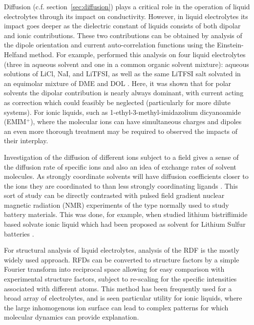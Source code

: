 \documentclass[../main.tex]{subfiles}
\begin{document}
Diffusion (c.f. section~\ref{sec:diffusion}) plays a critical role in the operation of liquid electrolytes through its impact on conductivity. However, in liquid electrolytes its impact goes deeper as the dielectric constant of liquids consists of both dipolar and ionic contributions. These two contributions can be obtained by analysis of the dipole orientation and current auto-correlation functions using the Einstein-Helfand method. For example, \citeauthor{coles_correlation_2020} performed this analysis on four liquid electrolytes (three in aqueous solvent and one in a common organic solvent mixture): aqueous solutions of LiCl, NaI, and LiTFSI, as well as the same LiTFSI salt solvated in an equimolar mixture of DME and DOL \cite{coles_correlation_2020}. Here, it was shown that for polar solvents the dipolar contribution is nearly always dominant, with current acting as correction which could feasibly be neglected (particularly for more dilute systems). For ionic liquids, such as 1-ethyl-3-methyl-imidazolium dicyanoamide (EMIM$^+$), where the molecular ions can have simultaneous charges and dipoles an even more thorough treatment may be required to observed the impacts of their interplay\cite{schroder_dielectric_2009}.

Investigation of the diffusion of different ions subject to a field gives a sense of the diffusion rate of specific ions and also an idea of exchange rates of solvent molecules. As strongly coordinate solvents will have diffusion coefficients closer to the ions they are coordinated to than less strongly coordinating ligands \cite{shimizu_structural_2015, lesch_influence_2015, borodin_litfsi_2006,borodin_li_2006,borodin_li_2007}. This sort of study can be directly contrasted with pulsed field gradient nuclear magnetic radiation (NMR) experiments of the type normally used to study battery materials. This was done, for example, when \citeauthor{shimizu_structural_2015} studied lithium bistriflimide based solvate ionic liquid which had been proposed as solvent for Lithium Sulfur batteries \cite{shimizu_structural_2015}.

For structural analysis of liquid electrolytes, analysis of the RDF is the mostly widely used approach. RFDs can be converted to structure factors by a simple Fourier transform into reciprocal space allowing for easy comparison with experimental structure factors\cite{shimizu_structural_2015,pethes_comparison_2017,hanke_intermolecular_2001,tsuzuki_molecular_2009}, subject to re-scaling for the specific intensities associated with different atoms. This method has been frequently used for a broad array of electrolytes, and is seen particular utility for ionic liquids, where the large inhomogenous ion surface can lead to complex patterns for which molecular dynamics can provide explanation.
\end{document}
